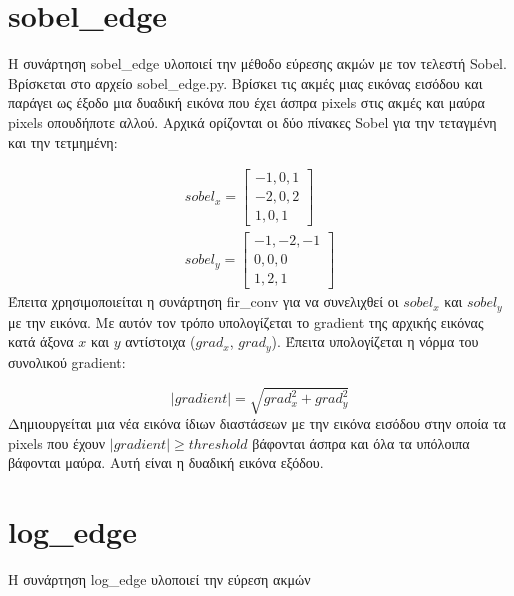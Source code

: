 \documentclass{article}
\begin{document}
\section{sobel\_edge}\label{sobel}
Η συνάρτηση sobel\_edge υλοποιεί την μέθοδο εύρεσης ακμών με τον τελεστή 
Sobel. Βρίσκεται στο αρχείο sobel\_edge.py. Βρίσκει τις ακμές μιας εικόνας
εισόδου και παράγει ως έξοδο μια δυαδική εικόνα που έχει άσπρα pixels στις 
ακμές και μαύρα pixels οπουδήποτε αλλού. Αρχικά ορίζονται οι δύο πίνακες Sobel
για την τεταγμένη και την τετμημένη:

\begin{gather}
    sobel_x = \left[\begin{matrix}
        -1, 0, 1 \\
        -2, 0, 2 \\
         1, 0, 1
    \end{matrix}\right] \\
    sobel_y = \left[\begin{matrix}
        -1, -2, -1 \\
         0,  0,  0 \\
         1,  2,  1
    \end{matrix}\right] 
\end{gather}
Έπειτα χρησιμοποιείται η συνάρτηση fir\_conv για να συνελιχθεί οι $sobel_x$ και
$sobel_y$ με την εικόνα. Με αυτόν τον τρόπο υπολογίζεται το gradient της αρχικής
εικόνας κατά άξονα $x$ και $y$ αντίστοιχα ($grad_x$, $grad_y$). Έπειτα υπολογίζεται 
η νόρμα του συνολικού gradient:

\begin{equation}
    |gradient| = \sqrt{grad_x^2 + grad_y^2}
\end{equation}
Δημιουργείται μια νέα εικόνα ίδιων διαστάσεων με την εικόνα εισόδου στην οποία 
τα pixels που έχουν $|gradient| \geq threshold$ βάφονται άσπρα και όλα τα 
υπόλοιπα βάφονται μαύρα. Αυτή είναι η δυαδική εικόνα εξόδου.

\section{log\_edge}\label{log}
H συνάρτηση log\_edge υλοποιεί την εύρεση ακμών 
\end{document}
